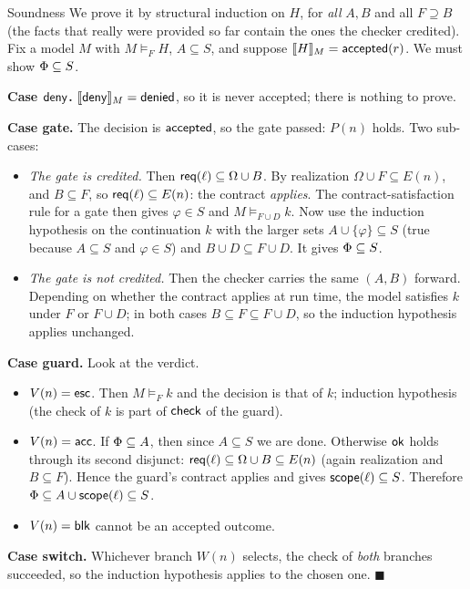 \begin{plainproof}{Soundness}
We prove it by structural induction on $H$, for \emph{all} $A,B$ and all $F\supseteq B$ (the facts that really were provided so far contain the ones the checker credited). Fix a model $M$ with $M\models_F H$, $A\subseteq S$, and suppose $\llbracket H\rrbracket_{M}=\mathsf{accepted}(r)$. We must show $\Phi\subseteq S$.

\medskip\textbf{Case $\mathsf{deny}$.} $\llbracket \mathsf{deny}\rrbracket_{M}=\mathsf{denied}$, so it is never accepted; there is nothing to prove.

\medskip\textbf{Case gate.} The decision is $\mathsf{accepted}$, so the gate passed: $P(n)$ holds. Two sub-cases:
\begin{itemize}
\item \emph{The gate is credited.} Then $\mathsf{req}(\ell)\subseteq\Omega\cup B$. By realization $\Omega\cup F\subseteq E(n)$, and $B\subseteq F$, so $\mathsf{req}(\ell)\subseteq E(n)$: the contract \emph{applies}. The contract-satisfaction rule for a gate then gives $\varphi\in S$ and $M\models_{F\cup D}k$. Now use the induction hypothesis on the continuation $k$ with the larger sets $A\cup\{\varphi\}\subseteq S$ (true because $A\subseteq S$ and $\varphi\in S$) and $B\cup D\subseteq F\cup D$. It gives $\Phi\subseteq S$.
\item \emph{The gate is not credited.} Then the checker carries the same $(A,B)$ forward. Depending on whether the contract applies at run time, the model satisfies $k$ under $F$ or $F\cup D$; in both cases $B\subseteq F\subseteq F\cup D$, so the induction hypothesis applies unchanged.
\end{itemize}

\medskip\textbf{Case guard.} Look at the verdict.
\begin{itemize}
\item $V(n)=\mathsf{esc}$. Then $M\models_F k$ and the decision is that of $k$; induction hypothesis (the check of $k$ is part of $\mathsf{check}$ of the guard).
\item $V(n)=\mathsf{acc}$. If $\Phi\subseteq A$, then since $A\subseteq S$ we are done. Otherwise $\mathsf{ok}$ holds through its second disjunct: $\mathsf{req}(\ell)\subseteq\Omega\cup B\subseteq E(n)$ (again realization and $B\subseteq F$). Hence the guard's contract applies and gives $\mathsf{scope}(\ell)\subseteq S$. Therefore $\Phi\subseteq A\cup\mathsf{scope}(\ell)\subseteq S$.
\item $V(n)=\mathsf{blk}$ cannot be an accepted outcome.
\end{itemize}

\medskip\textbf{Case switch.} Whichever branch $W(n)$ selects, the check of \emph{both} branches succeeded, so the induction hypothesis applies to the chosen one. \hfill$\blacksquare$
\end{plainproof}

